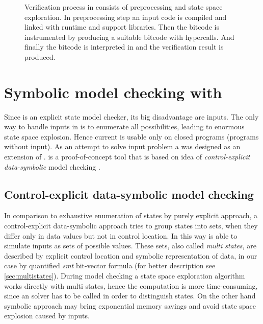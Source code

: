 \begin{figure}[!ht]
{
}
\caption{Verification process in \DIVINE consists of preprocessing and
state space exploration. In preprocessing step an input code is
compiled and linked with \DIOS runtime and \DIVINE support
libraries. Then the bitcode is instrumented by \LART producing a suitable \LLVM bitcode with \DIVM hypercalls. And finally the bitcode is interpreted in \DIVM and the verification result is produced.}\label{fig:verification}
\end{figure}

\section{Symbolic model checking with \SymDIVINE}\label{sub:symdivine}

Since \DIVINE is an explicit state model checker, its big disadvantage are inputs. The
only way to handle inputs in \DIVINE is to enumerate all possibilities, leading to
enormous state space explosion. Hence current \DIVINE is usable only on
closed programs (programs without input). As an attempt to solve input problem a
\SymDIVINE was designed as an extension of \DIVINE. \SymDIVINE is
a proof-of-concept tool that is based on idea of \emph{control-explicit data-symbolic}
model checking \cite{Barnat14}.

\subsection{Control-explicit data-symbolic model checking}

In comparison to exhaustive enumeration of states by purely explicit approach, a
control-explicit data-symbolic approach tries to group states into sets, when
they differ only in data values but not in control location. In this way \SymDIVINE is able to
simulate inputs as sets of possible values. These sets, also called \emph{multi states}, are described by explicit control location and symbolic representation of
data, in our case by quantified \emph{smt} bit-vector formula (for better description see
\autoref{sec:multistates}). During model checking a state space exploration
algorithm works directly with multi states, hence the computation is more
time-consuming, since an \SMT solver has to be called in order to
distinguish states. On the other hand symbolic approach may bring
exponential memory savings and avoid state space explosion caused by inputs.

